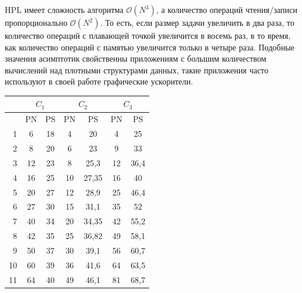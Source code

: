 	HPL имеет сложность алгоритма \(\mathcal{O}(N^3)\), а количество операций чтения/записи пропорционально \(\mathcal{O}(N^2)\). То есть, если размер задачи увеличить в два раза, то количество операций с плавающей точкой увеличится в восемь раз, в то время, как количество операций с памятью увеличится только в четыре раза. Подобные значения асимптотик свойственны приложениям с большим количеством вычислений над плотными структурами данных, такие приложения часто используют в своей работе графические ускорители.

	\begin{table}
		\centering
		\begin{tabular}{|r||c|c||c|c||c|c|}
			\hline
			            & \multicolumn{2}{c|}{\(C_1\)} & \multicolumn{2}{c|}{\(C_2\)} & \multicolumn{2}{c|}{\(C_3\)} \\ \hline
			\textnumero &  PN &                     PS &  PN &                     PS &  PN & PS                     \\ \hline
			1           &   6 &                     18 &   4 &                     20 &   4 & 25                     \\ \hline
			2           &   8 &                     20 &   6 &                     23 &   9 & 33                     \\ \hline
			3           &  12 &                     23 &   8 &                   25,3 &  12 & 36,4                   \\ \hline
			4           &  16 &                     25 &  10 &                  27,35 &  16 & 40 					 \\ \hline
			5           &  20 &                     27 &  12 &                   28,9 &  25 & 46,4 					 \\ \hline
			6           &  27 &                     30 &  15 &                   31,1 &  35 & 52 					 \\ \hline
			7           &  40 &                     34 &  20 &                  34,35 &  42 & 55,2 					 \\ \hline
			8           &  42 &                     35 &  25 &                  36,82 &  49 & 58,1                   \\ \hline
			9           &  50 &                     37 &  30 &                   39,1 &  56 & 60,7                   \\ \hline
			10          &  60 &                     39 &  36 &                   41,6 &  64 & 63,5                   \\ \hline
			11          &  64 &                     40 &  49 &                   46,1 &  81 & 68,7                   \\ \hline

\end{tabular}
\end{table}

